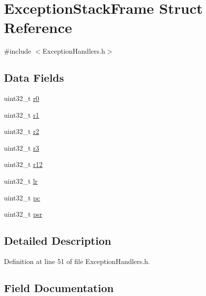 \hypertarget{struct_exception_stack_frame}{}\section{Exception\+Stack\+Frame Struct Reference}
\label{struct_exception_stack_frame}


{\ttfamily \#include $<$Exception\+Handlers.\+h$>$}

\subsection*{Data Fields}
\begin{DoxyCompactItemize}
\item 
uint32\+\_\+t \hyperlink{struct_exception_stack_frame_a592a962c55cf82b46c73c892a6e4fd49}{r0}
\item 
uint32\+\_\+t \hyperlink{struct_exception_stack_frame_a241f774bd9124717ac8d6cfa094a6d1b}{r1}
\item 
uint32\+\_\+t \hyperlink{struct_exception_stack_frame_a3f3de83e4d1261e394f4547c8ec0198f}{r2}
\item 
uint32\+\_\+t \hyperlink{struct_exception_stack_frame_ad4e4edcda33d8d8453c34e205f3836ac}{r3}
\item 
uint32\+\_\+t \hyperlink{struct_exception_stack_frame_aa36a3c046c2e3b281b4cd7b3f52a044a}{r12}
\item 
uint32\+\_\+t \hyperlink{struct_exception_stack_frame_a6ced3f4007bb60daf12191c058e55b8c}{lr}
\item 
uint32\+\_\+t \hyperlink{struct_exception_stack_frame_afaa20335217fae16f0e22b466017dae1}{pc}
\item 
uint32\+\_\+t \hyperlink{struct_exception_stack_frame_a62a4d778a5a6da71db806fc36b6c01f7}{psr}
\end{DoxyCompactItemize}


\subsection{Detailed Description}


Definition at line 51 of file Exception\+Handlers.\+h.



\subsection{Field Documentation}
